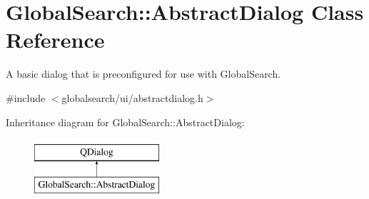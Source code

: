 \hypertarget{classGlobalSearch_1_1AbstractDialog}{\section{Global\-Search\-:\-:Abstract\-Dialog Class Reference}
\label{classGlobalSearch_1_1AbstractDialog}
}


A basic dialog that is preconfigured for use with Global\-Search.  




{\ttfamily \#include $<$globalsearch/ui/abstractdialog.\-h$>$}

Inheritance diagram for Global\-Search\-:\-:Abstract\-Dialog\-:\begin{figure}[H]
\begin{center}
\leavevmode
\includegraphics[height=2.000000cm]{classGlobalSearch_1_1AbstractDialog}
\end{center}
\end{figure}
